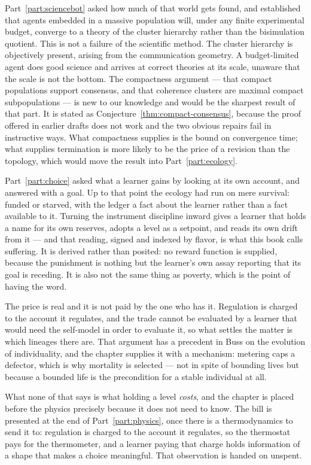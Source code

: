 Part~\ref{part:sciencebot} asked how much of that world gets found, and
established that agents embedded in a massive population will, under any
finite experimental budget, converge to a theory of the cluster hierarchy
rather than the bisimulation quotient.
This is not a failure of the scientific method.
The cluster hierarchy is objectively present, arising from the
communication geometry.
A budget-limited agent does good science and arrives at correct theories
at its scale, unaware that the scale is not the bottom.
The compactness argument --- that compact populations support consensus,
and that coherence clusters are maximal compact subpopulations --- is new
to our knowledge and would be the sharpest result of that part.
It is stated as Conjecture~\ref{thm:compact-consensus}, because the
proof offered in earlier drafts does not work and the two obvious
repairs fail in instructive ways.
What compactness supplies is the bound on convergence time; what
supplies termination is more likely to be the price of a revision than
the topology, which would move the result into
Part~\ref{part:ecology}.

Part~\ref{part:choice} asked what a learner gains by looking at its own
account, and answered with a goal.
Up to that point the ecology had run on mere survival: funded or starved,
with the ledger a fact about the learner rather than a fact available to
it.
Turning the instrument discipline inward gives a learner that holds a
name for its own reserves, adopts a level as a setpoint, and reads its
own drift from it --- and that reading, signed and indexed by flavor, is
what this book calls suffering.
It is derived rather than posited: no reward function is supplied,
because the punishment is nothing but the learner's own assay reporting
that its goal is receding.
It is also not the same thing as poverty, which is the point of having
the word.

The price is real and it is not paid by the one who has it.
Regulation is charged to the account it regulates, and the trade cannot
be evaluated by a learner that would need the self-model in order to
evaluate it, so what settles the matter is which lineages there are.
That argument has a precedent in Buss on the evolution of individuality,
and the chapter supplies it with a mechanism: metering caps a defector,
which is why mortality is selected --- not in spite of bounding lives but
because a bounded life is the precondition for a stable individual at
all.

What none of that says is what holding a level \emph{costs}, and the
chapter is placed before the physics precisely because it does not need
to know.
The bill is presented at the end of Part~\ref{part:physics}, once there
is a thermodynamics to send it to: regulation is charged to the account
it regulates, so the thermostat pays for the thermometer, and a learner
paying that charge holds information of a shape that makes a choice
meaningful.
That observation is handed on unspent.

